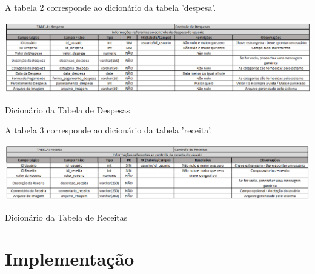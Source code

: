     A tabela 2 corresponde ao dicionário da tabela 'despesa'.

\begin{table}[ht]
    \centering
    \setlength{\extrarowheight}{3pt}  %

    \begin{center}
        \begin{minipage}{\textwidth}
            \centering
            \includegraphics[scale=0.5]{figs/tab2.png}
        \end{minipage}
    \end{center}

    \caption{Dicionário da Tabela de Despesas}
    \label{tab:tab1}
\end{table}

    A tabela 3 corresponde ao dicionário da tabela 'receita'.

\begin{table}[ht]
    \centering
    \setlength{\extrarowheight}{3pt}  %

    \begin{center}
        \begin{minipage}{\textwidth}
            \centering
            \includegraphics[scale=0.5]{figs/tab3.png}
        \end{minipage}
    \end{center}

    \caption{Dicionário da Tabela de Receitas}
    \label{tab:tab1}
\end{table}

\vspace{\baselineskip}
\vspace{\baselineskip}
\vspace{\baselineskip}

\section{Implementação}

